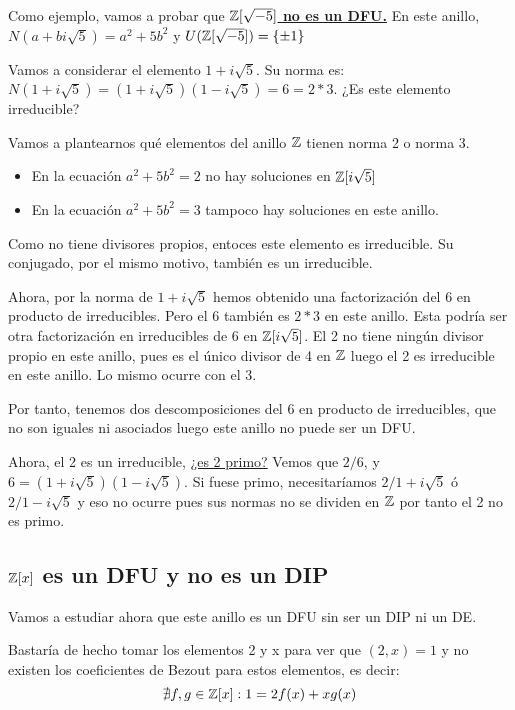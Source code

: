 \begin{ejemplo} $\quad$

Como ejemplo, vamos a probar que \textbf{\underline{$\mathbb{Z}[\sqrt{-5}]$ no es un DFU.}} En este anillo, $N(a+bi\sqrt5) = a^2 + 5b^2$ y $U(\mathbb{Z}[\sqrt{-5}])= \{\pm 1\}$

Vamos a considerar el elemento $1+i\sqrt5$. Su norma es: $N(1+i\sqrt5) = (1+i\sqrt5)(1-i\sqrt5) = 6 = 2 * 3$. ¿Es este elemento irreducible?

Vamos a plantearnos qué elementos del anillo $\mathbb{Z}$ tienen norma 2 o norma 3.
\begin{itemize}
	\item En la ecuación $a^2+5b^2= 2$ no hay soluciones en $\mathbb{Z}[i\sqrt5]$
	\item En la ecuación $a^2+5b^2 = 3$ tampoco hay soluciones en este anillo.
\end{itemize}
	Como no tiene divisores propios, entoces este elemento es irreducible. Su conjugado, por el mismo motivo, también es un irreducible.

	Ahora, por la norma de $1+i\sqrt5$ hemos obtenido una factorización del 6 en producto de irreducibles. Pero el 6 también es $2*3$ en este anillo. Esta podría ser otra factorización en irreducibles de 6 en $\mathbb{Z} [i\sqrt5]$. El 2 no tiene ningún divisor propio en este anillo, pues es el único divisor de 4 en $\mathbb{Z}$ luego el 2 es irreducible en este anillo. Lo mismo ocurre con el 3.

	Por tanto, tenemos dos descomposiciones del 6 en producto de irreducibles, que no son iguales ni asociados luego este anillo no puede ser un DFU.

	Ahora, el 2 es un irreducible, \underline{¿es 2 primo?} Vemos que $2/6$, y $6 = (1+i\sqrt5)(1-i\sqrt5)$. Si fuese primo, necesitaríamos $2/1+i\sqrt5$ ó $2/1-i\sqrt5$ y eso no ocurre pues sus normas no se dividen en $\mathbb{Z}$ por tanto el 2 no es primo.
\end{ejemplo}

\subsection{$\mathbb{Z}[x]$ es un DFU y no es un DIP}

Vamos a estudiar ahora que este anillo es un DFU sin ser un DIP ni un DE.

Bastaría de hecho tomar los elementos 2 y x para ver que $(2,x) = 1$ y no existen los coeficientes de Bezout para estos elementos, es decir:
\[
\nexists f,g \in \mathbb{Z}[x] : 1 = 2f(x)+ xg(x)
\]

